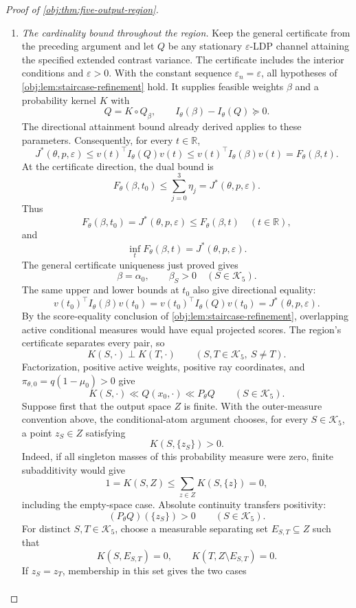 \documentclass[11pt]{article}
\begin{document}
\begin{proof}[Proof of \cref{obj:thm:five-output-region}]
\begin{enumerate}
\item \textit{The cardinality bound throughout the region.}
Keep the general certificate from the preceding argument and let \(Q\)
be any stationary \(\varepsilon\)-LDP channel attaining the specified
extended contrast variance. The certificate includes the interior
conditions and \(\varepsilon>0\). With the constant sequence
\(\varepsilon_n=\varepsilon\), all hypotheses of
\cref{obj:lem:staircase-refinement} hold. It supplies feasible weights
\(\beta\) and a probability kernel \(K\) with
\[
Q=K\circ Q_\beta,
\qquad
I_\theta(\beta)-I_\theta(Q)\succeq0.
\]
The directional attainment bound already derived applies to these
parameters. Consequently, for every \(t\in\mathbb R\),
\[
J^*(\theta,p,\varepsilon)
\le v(t)^\top I_\theta(Q)v(t)
\le v(t)^\top I_\theta(\beta)v(t)
=F_\theta(\beta,t).
\]
At the certificate direction, the dual bound is
\[
F_\theta(\beta,t_0)\le
\sum_{j=0}^3\eta_j
=
J^*(\theta,p,\varepsilon).
\]
Thus
\[
F_\theta(\beta,t_0)=J^*(\theta,p,\varepsilon)
\le F_\theta(\beta,t)\quad(t\in\mathbb R),
\]
and
\[
\inf_tF_\theta(\beta,t)=J^*(\theta,p,\varepsilon).
\]
The general certificate uniqueness just proved gives
\[
\beta=\alpha_0,\qquad \beta_S>0\quad(S\in\mathcal K_5).
\]
The same upper and lower bounds at \(t_0\) also give directional equality:
\[
v(t_0)^\top I_\theta(\beta)v(t_0)
=
v(t_0)^\top I_\theta(Q)v(t_0)
=
J^*(\theta,p,\varepsilon).
\]
By the score-equality conclusion of
\cref{obj:lem:staircase-refinement}, overlapping active conditional
measures would have equal projected scores. The region's certificate
separates every pair, so
\[
K(S,\cdot)\perp K(T,\cdot)
\qquad(S,T\in\mathcal K_5,\ S\ne T).
\]
Factorization, positive active weights, positive ray coordinates, and
\(\pi_{\theta,0}=q(1-\mu_0)>0\) give
\[
K(S,\cdot)\ll Q(x_0,\cdot)\ll P_\theta Q
\qquad(S\in\mathcal K_5).
\]
Suppose first that the output space \(Z\) is finite. With the outer-measure
convention above, the conditional-atom argument chooses, for every
\(S\in\mathcal K_5\), a point
\(z_S\in Z\) satisfying
\[
K(S,\{z_S\})>0.
\]
Indeed, if all singleton masses of this probability measure were zero,
finite subadditivity would give
\[
1=K(S,Z)\le\sum_{z\in Z}K(S,\{z\})=0,
\]
including the empty-space case. Absolute continuity transfers positivity:
\[
(P_\theta Q)(\{z_S\})>0\qquad(S\in\mathcal K_5).
\]
For distinct \(S,T\in\mathcal K_5\), choose a measurable separating set
\(E_{S,T}\subseteq Z\) such that
\[
K(S,E_{S,T})=0,\qquad K(T,Z\setminus E_{S,T})=0.
\]
If \(z_S=z_T\), membership in this set gives the two cases
\[
\begin{aligned}

\end{aligned}\]
\end{enumerate}
\end{proof}
\end{document}
